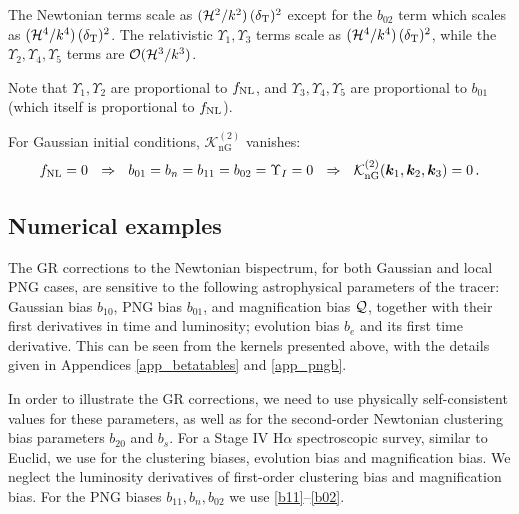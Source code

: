 {{{\begin{itemize}
{The Newtonian terms scale as $(\mathcal{H}^2/k^2)\,(\delta_{\mathrm{T}})^2$ except for the $b_{02}$ term which scales as $(\mathcal{H}^4/k^4)\,(\delta_{\mathrm{T}})^2$. The relativistic $\Upsilon_1, \Upsilon_3$ terms scale as $(\mathcal{H}^4/k^4)\,(\delta_{\mathrm{T}})^2$, while the $\Upsilon_2, \Upsilon_4, \Upsilon_5$ terms are  ${\cal O}(\mathcal{H}^3/k^3)$.}

Note that $\Upsilon_1,\Upsilon_2$ are proportional to $f_\text{NL}$, and $\Upsilon_3,\Upsilon_4,\Upsilon_5$ are  proportional to $b_{01}$ (which itself is proportional to $f_\text{NL}$).

For Gaussian initial conditions, $\mathcal{K}^{(2)}_{\mathrm{nG}}$ vanishes: 
\begin{equation}
f_\text{NL}=0~~\Rightarrow~~b_{01}=b_n=b_{11}=b_{02}=\Upsilon_I=0 ~~\Rightarrow~~ \mathcal{K}^{(2)}_{\mathrm{nG}}(\bm{k}_{1}, \bm{k}_{2}, \bm{k}_{3})=0\,.
\end{equation}

\end{itemize}
%
\subsection{Numerical examples}
{The GR corrections to the Newtonian bispectrum, for both Gaussian and local PNG cases, are sensitive to the following astrophysical parameters of the tracer: Gaussian bias $b_{10}$, PNG bias $b_{01}$,  and magnification bias ${\cal Q}$, together with  their first derivatives in time and luminosity; evolution bias $b_e$ and its first  time derivative. This can be seen from the kernels presented above,  with the details given in Appendices \ref{app_betatables} and \ref{app_pngb}.} 

In order to illustrate the GR corrections, we need to use physically self-consistent values for these parameters, as well as for the second-order Newtonian clustering bias parameters $b_{20}$ and $b_s$.  
For a Stage IV H$\alpha$ spectroscopic survey, similar to Euclid,  we use \cite{Maartens:2019yhx} for the  clustering biases, evolution bias and magnification bias. {We neglect the luminosity derivatives of first-order clustering bias and magnification bias. For the PNG biases $b_{11}, b_n, b_{02}$ we use \eqref{b11}--\eqref{b02}.}

}}}
